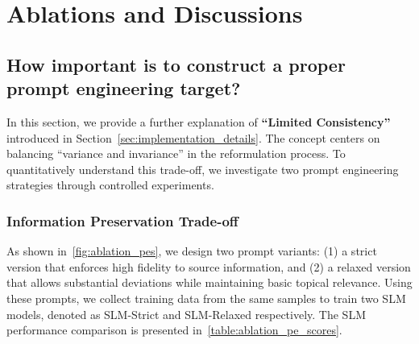 \section{Ablations and Discussions}
\label{sec:ablations}

\subsection{How important is to construct a proper prompt engineering target?}
\label{sec:ablation_pe}
\vspace{-0.5em}
In this section, we provide a further explanation of \textbf{``Limited Consistency''} introduced in Section~\ref{sec:implementation_details}.
The concept centers on balancing ``variance and invariance'' in the reformulation process.
To quantitatively understand this trade-off, we investigate two prompt engineering strategies through controlled experiments.

\vspace{-0.5em}
\subsubsection{Information Preservation Trade-off}

As shown in~\autoref{fig:ablation_pes}, we design two prompt variants:
(1) a strict version that enforces high fidelity to source information,
and (2) a relaxed version that allows substantial deviations while maintaining basic topical relevance.
Using these prompts, we collect training data from the same samples to train two SLM models,
denoted as SLM-Strict and SLM-Relaxed respectively.
The SLM performance comparison is presented in~\autoref{table:ablation_pe_scores}.

\begin{table*}[h]
    \vspace{-1em}
    \centering
    \caption{Performance comparison of different SLM variants on reformulation quality metrics.}
    \begin{adjustbox}{max width=0.9\textwidth}
    \end{adjustbox}

\label{table:ablation_pe_scores}
\end{table*}

